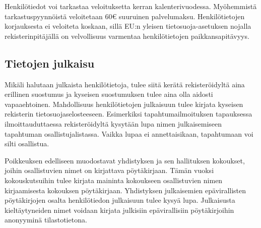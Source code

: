 \documentclass[finnish]{tktltiki}
\begin{document}
Henkilötiedot voi tarkastaa veloituksetta kerran kalenterivuodessa. Myöhemmistä tarkastuspyynnöistä veloitetaan 60€ suuruinen palvelumaksu. Henkilötietojen korjauksesta ei veloiteta koskaan, sillä EU:n yleisen tietosuoja-asetuksen nojalla rekisterinpitäjällä on velvollisuus varmentaa henkilötietojen paikkansapitävyys.


\subsection*{Tietojen julkaisu}

Mikäli halutaan julkaista henkilötietoja, tulee siitä kerätä rekisteröidyltä aina erillinen suostumus ja kyseisen suostumuksen tulee aina olla aidosti vapaaehtoinen. Mahdollisuus henkilötietojen julkaisuun tulee kirjata kyseisen rekisterin tietosuojaselosteeseen. Esimerkiksi tapahtumailmoituksen tapauksessa ilmoittauduttaessa rekisteröidyltä kysytään lupa nimen julkaisemiseen tapahtuman osallistujalistassa. Vaikka lupaa ei annettaisikaan, tapahtumaan voi silti osallistua.

Poikkeuksen edelliseen muodostavat yhdistyksen ja sen hallituksen kokoukset, joihin osallistuvien nimet on kirjattava pöytäkirjaan. Tämän vuoksi kokouskutsuihin tulee kirjata maininta kokoukseen osallistuvien nimen kirjaamisesta kokouksen pöytäkirjaan. Yhdistyksen julkaisemien epävirallisten pöytäkirjojen osalta henkilötiedon julkaisuun tulee kysyä lupa. Julkaisusta kieltäytyneiden nimet voidaan kirjata julkisiin epävirallisiin pöytäkirjoihin anonyyminä tilastotietona.
\end{document}
